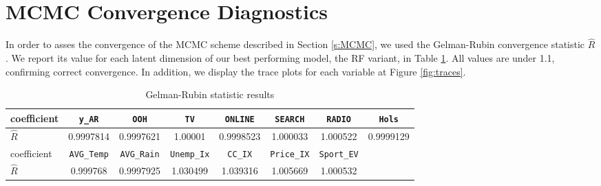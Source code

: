 
\section{MCMC Convergence Diagnostics}\label{app:GR}

In order to asses the convergence of the MCMC scheme described in Section \ref{s:MCMC}, we used the Gelman-Rubin convergence statistic $\hat{R}$. We report its value for each latent dimension of our best performing model, the RF variant, in Table \ref{tab:GR}. All values are under 1.1, confirming correct convergence. In addition, we display the trace plots for each variable at Figure \ref{fig:traces}.


\begin{table}[H]
\centering
{\footnotesize 
\begin{tabular}{|l|c|c|c|c|c|c|c|}
\hline
coefficient & \texttt{y\_AR} & \texttt{OOH} & \texttt{TV} & \texttt{ONLINE} & \texttt{SEARCH} & \texttt{RADIO} & \texttt{Hols} \\
\hline 
$\hat{R}$ & 0.9997814 & 0.9997621 & 1.00001 & 0.9998523 & 1.000033 & 1.000522 & 0.9999129 \\
\hline
coefficient & \texttt{AVG\_Temp} & \texttt{AVG\_Rain} & \texttt{Unemp\_Ix} & \texttt{CC\_IX} &  \texttt{Price\_IX}& \texttt{Sport\_EV}  & \\
\hline
$\hat{R}$ & 0.999768 & 0.9997925 & 1.030499 & 1.039316 & 1.005669 & 1.000532 & \\
\hline
\end{tabular}\caption{Gelman-Rubin statistic results}\label{tab:GR}
}
\end{table}


